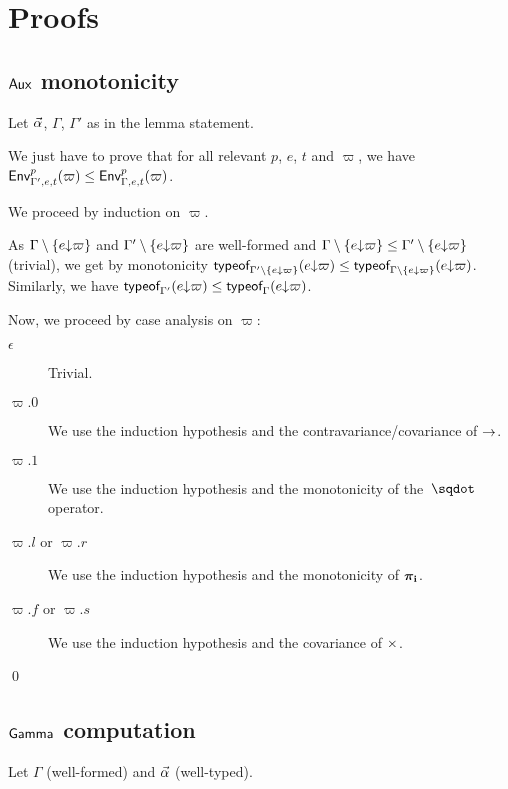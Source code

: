 \documentclass[a4paper]{article}
\theoremstyle{definition}
\begin{document}
    \section{Proofs}

    \subsection{$\textsf{Aux}_{}$ monotonicity}

      Let $\vec \alpha$, $\Gamma$, $\Gamma'$ as in the lemma statement.

      We just have to prove that for all relevant $p$, $e$, $t$ and $\varpi$, we have $\textsf{Env}^{p}_{\Gamma',e,t} (\varpi) \leq \textsf{Env}^{p}_{\Gamma,e,t} (\varpi)$.

      We proceed by induction on $\varpi$. 

      As $\Gamma\setminus\{e{\downarrow}\varpi\}$ and $\Gamma'\setminus\{e{\downarrow}\varpi\}$ are well-formed and $\Gamma\setminus\{e{\downarrow}\varpi\} \leq \Gamma'\setminus\{e{\downarrow}\varpi\}$ (trivial),
      we get by monotonicity $\textsf{typeof}_{\Gamma'\setminus\{e{\downarrow}\varpi\}}(e{\downarrow}\varpi) \leq \textsf{typeof}_{\Gamma\setminus\{e{\downarrow}\varpi\}}(e{\downarrow}\varpi)$.
      Similarly, we have $\textsf{typeof}_{\Gamma'}(e{\downarrow}\varpi) \leq \textsf{typeof}_{\Gamma}(e{\downarrow}\varpi)$.

      Now, we proceed by case analysis on $\varpi$:
      \begin{description}
        \item[$\epsilon$] Trivial.
        \item[$\varpi.0$] We use the induction hypothesis and the contravariance/covariance of $\to$.
        \item[$\varpi.1$] We use the induction hypothesis and the monotonicity of the $\worra {} {}$ operator.
        \item[$\varpi.l$ or $\varpi.r$] We use the induction hypothesis and the monotonicity of $\boldsymbol{\pi}_{\mathbf{i}}$.
        \item[$\varpi.f$ or $\varpi.s$] We use the induction hypothesis and the covariance of $\times$.
      \end{description}
    
      \qed

    \subsection{$\textsf{Gamma}_{}$ computation}

    Let $\Gamma$ (well-formed) and $\vec \alpha$ (well-typed).
\end{document}
